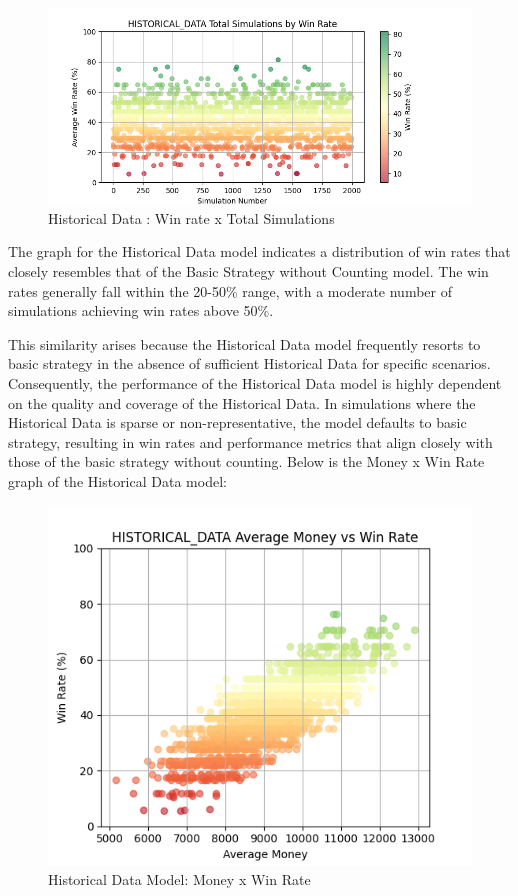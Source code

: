 \documentclass[a4paper,12pt]{report}
\begin{document}
\begin{figure}[h]
\begin{center}
\includegraphics[scale=0.6]{figures/graphs/hd_wr_ts.png}
\end{center}
\caption{Historical Data : Win rate x Total Simulations}
\label{fig:hd_wr_ts}
\end{figure}

The graph for the Historical Data model indicates a distribution of win rates that closely resembles that of the Basic Strategy without Counting model. The win rates generally fall within the 20-50\% range, with a moderate number of simulations achieving win rates above 50\%. 

This similarity arises because the Historical Data model frequently resorts to basic strategy in the absence of sufficient Historical Data for specific scenarios. Consequently, the performance of the Historical Data model is highly dependent on the quality and coverage of the Historical Data. In simulations where the Historical Data is sparse or non-representative, the model defaults to basic strategy, resulting in win rates and performance metrics that align closely with those of the basic strategy without counting. Below is the Money x Win Rate graph of the Historical Data model:

\begin{figure}[h]
\begin{center}
\includegraphics[scale=0.6]{figures/graphs/hd_wr.png}
\end{center}
\caption{Historical Data Model: Money x Win Rate}
\label{fig:hd_wr}
\end{figure}
\end{document}
